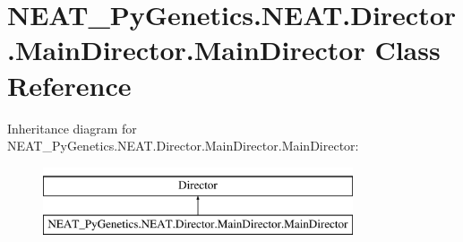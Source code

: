 \hypertarget{classNEAT__PyGenetics_1_1NEAT_1_1Director_1_1MainDirector_1_1MainDirector}{}\section{N\+E\+A\+T\+\_\+\+Py\+Genetics.\+N\+E\+A\+T.\+Director.\+Main\+Director.\+Main\+Director Class Reference}
\label{classNEAT__PyGenetics_1_1NEAT_1_1Director_1_1MainDirector_1_1MainDirector}
Inheritance diagram for N\+E\+A\+T\+\_\+\+Py\+Genetics.\+N\+E\+A\+T.\+Director.\+Main\+Director.\+Main\+Director\+:\begin{figure}[H]
\begin{center}
\leavevmode
\includegraphics[height=2.000000cm]{classNEAT__PyGenetics_1_1NEAT_1_1Director_1_1MainDirector_1_1MainDirector}
\end{center}
\end{figure}
